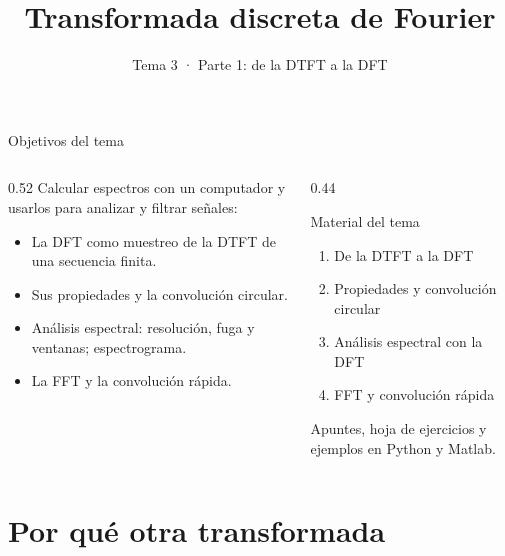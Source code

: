 \documentclass[aspectratio=169,11pt]{beamer}
\title[T3 · DFT]{Transformada discreta de Fourier}
\subtitle{Tema 3 · Parte 1: de la DTFT a la DFT}
\begin{document}
\portada

\begin{frame}{Objetivos del tema}
  \begin{columns}[T]
    \begin{column}{0.52\textwidth}
      Calcular espectros con un computador y usarlos para analizar y filtrar señales:
      \begin{itemize}
        \item La \alert{DFT} como muestreo de la DTFT de una secuencia finita.
        \item Sus propiedades y la \alert{convolución circular}.
        \item Análisis espectral: resolución, fuga y \alert{ventanas}; espectrograma.
        \item La \alert{FFT} y la convolución rápida.
      \end{itemize}
    \end{column}
    \begin{column}{0.44\textwidth}
      \begin{block}{Material del tema}
        \small
        \begin{enumerate}
          \item De la DTFT a la DFT
          \item Propiedades y convolución circular
          \item Análisis espectral con la DFT
          \item FFT y convolución rápida
        \end{enumerate}
        \smallskip
        Apuntes, hoja de ejercicios y ejemplos en Python y Matlab.
      \end{block}
    \end{column}
  \end{columns}
\end{frame}

\section{Por qué otra transformada}
\end{document}
